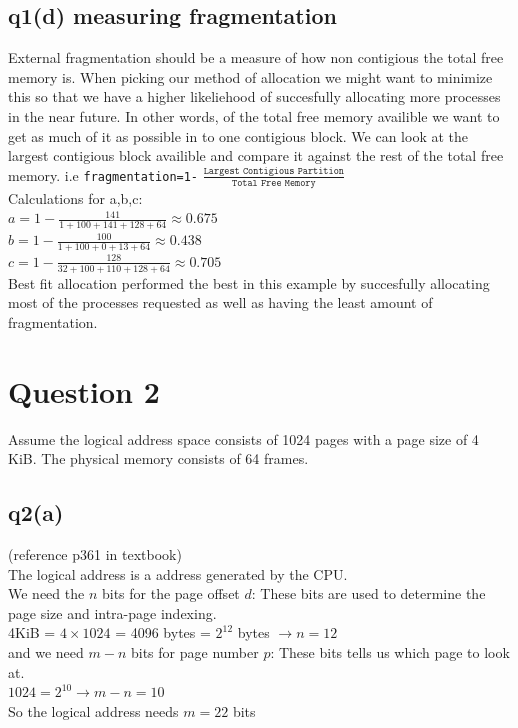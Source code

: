 \documentclass{assignment}
\def\code#1{\texttt{#1}}
\begin{document}
\subsection*{q1(d) measuring fragmentation}
External fragmentation should be a measure of how non contigious the total free memory is. When picking our method of allocation we might want to minimize this 
so that we have a higher likeliehood of succesfully allocating more processes in the near future.
In other words, of the total free memory availible we want to get as much of it as possible in to one contigious block. We can look at the largest contigious block availible and compare it 
against the rest of the total free memory.
i.e
\code{fragmentation=1-} $\frac{\code{Largest Contigious Partition}}{\code{Total Free Memory}}$ \\
Calculations for a,b,c: \\
$a = 1- \frac{141}{1+100+141+128+64} \approx 0.675$ \\

$b = 1- \frac{100}{1+100+0+13+64} \approx 0.438$ \\
$c = 1- \frac{128}{32+100+110+128+64} \approx 0.705$ \\

Best fit allocation performed the best in this example by succesfully allocating most of the processes requested as well as having the least
amount of fragmentation.

\section*{Question 2}
Assume the logical address space consists of 1024 pages with a page size of 4 KiB. The
physical memory consists of 64 frames.

\subsection*{q2(a)}
(reference p361 in textbook) \\
The logical address is a address generated by the CPU. \\
We need the $n$ bits for the page offset $d$: These bits are used to determine the page size and intra-page indexing. \\
4KiB = $4 \times 1024$ = 4096 bytes = $2^{12}$ bytes $\rightarrow n = 12$  \\
and we need $m-n$ bits for page number $p$: These bits tells us which page to look at. \\
$1024 = 2^{10} \rightarrow m-n = 10$ \\
So the logical address needs $m = 22$ bits
\end{document}
